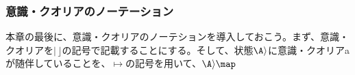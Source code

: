 \subsubsection{意識・クオリアのノーテーション}
本章の最後に、意識・クオリアのノーテションを導入しておこう。まず、意識・クオリアを$|\,\rfloor$の記号で記載することにする。そして、状態$\A\rangle$に意識・クオリアaが随伴していることを、$\mapsto$の記号を用いて、$\A\rangle \map$